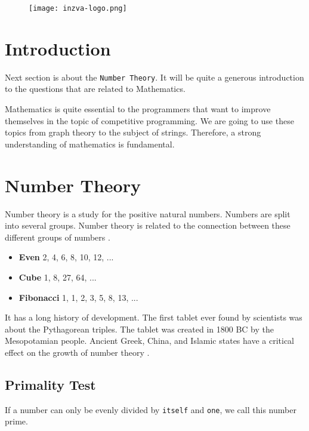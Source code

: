 \documentclass[12pt]{article}
\title{\vspace{-2em}\mytitle\vspace{-0.3em}}
\author{\textbf{Editor}\\Sadık Ekin Özbay \\ \ \\ \textbf{Reviewers} \\Yusuf Hakan Kalaycı \\ Burak Buğrul \\ Kadır Emre Oto \\ \ \\ \textbf{Contributors} \\ Ömer Talip Akalın}
\date{}
\begin{document}
\begin{figure}
  \centering
  \texttt{[image: inzva-logo.png]}
  \label{fig:inzva}
\end{figure}
\maketitle

\cleardoublepage
\tableofcontents
{}
\cleardoublepage

\section{Introduction}
Next section is about the \texttt{Number Theory}. It will be quite a generous introduction to the questions that are related to Mathematics.  

Mathematics is quite essential to the programmers that want to improve themselves in the topic of competitive programming. We are going to use these topics from graph theory to the subject of strings.  Therefore, a strong understanding of mathematics is fundamental.

\section{Number Theory}
Number theory is a study for the positive natural numbers. Numbers are split into several groups. Number theory is related to the connection between these different groups of numbers  \cite{numbertheory}.
\begin{itemize}
  \item \textbf{Even} \hspace{19mm} 2, 4, 6, 8, 10, 12, ...
  \item \textbf{Cube} \hspace{19mm} 1, 8, 27, 64, ...
  \item \textbf{Fibonacci} \hspace{10mm} 1, 1, 2, 3, 5, 8, 13, ...
\end{itemize}


It has a long history of development. The first tablet ever found by scientists was about the Pythagorean triples. The tablet was created in 1800 BC by the Mesopotamian people. Ancient Greek, China, and Islamic states have a critical effect on the growth of number theory \cite{wikipedianumbertheory}.


\subsection{Primality Test}
If a number can only be evenly divided by \texttt{itself} and \texttt{one}, we call this number prime.
\end{document}
